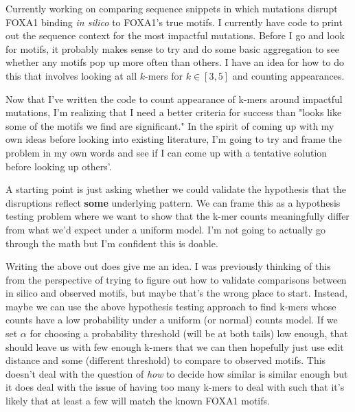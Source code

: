 \begin{Minutes}{}
\maketitle
{}
Currently working on comparing sequence snippets in which mutations disrupt FOXA1 binding \textit{in silico} to FOXA1's true motifs. I currently have code to print out the sequence context for the most impactful mutations. Before I go and look for motifs, it probably makes sense to try and do some basic aggregation to see whether any motifs pop up more often than others. I have an idea for how to do this that involves looking at all \( k \)-mers for \( k \in [3, 5] \) and counting appearances.

Now that I've written the code to count appearance of k-mers around impactful mutations, I'm realizing that I need a better criteria for success than "looks like some of the motifs we find are significant." In the spirit of coming up with my own ideas before looking into existing literature, I'm going to try and frame the problem in my own words and see if I can come up with a tentative solution before looking up others'. 

A starting point is just asking whether we could validate the hypothesis that the disruptions reflect \textbf{some} underlying pattern. We can frame this as a hypothesis testing problem where we want to show that the k-mer counts meaningfully differ from what we'd expect under a uniform model. I'm not going to actually go through the math but I'm confident this is doable. 

Writing the above out does give me an idea. I was previously thinking of this from the perspective of trying to figure out how to validate comparisons between in silico and observed motifs, but maybe that's the wrong place to start. Instead, maybe we can use the above hypothesis testing approach to find k-mers whose counts have a low probability under a uniform (or normal) counts model. If we set \( \alpha \) for choosing a probability threshold (will be at both tails) low enough, that should leave us with few enough k-mers that we can then hopefully just use edit distance and some (different threshold) to compare to observed motifs. This doesn't deal with the question of \textit{how} to decide how similar is similar enough but it does deal with the issue of having too many k-mers to deal with such that it's likely that at least a few will match the known FOXA1 motifs.

\end{Minutes}
